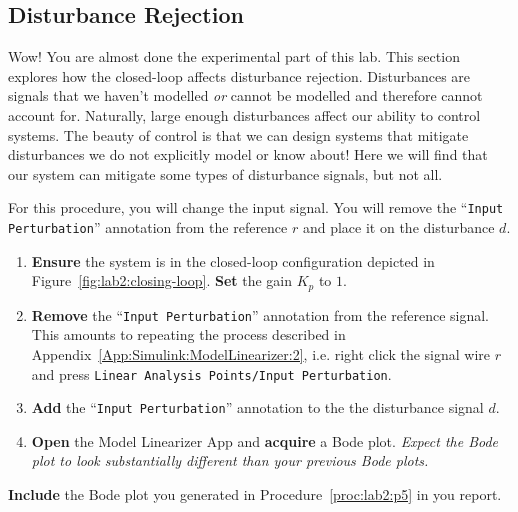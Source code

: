 \subsection{Disturbance Rejection}
Wow! You are almost done the experimental part of this lab. This section
explores how the closed-loop affects disturbance rejection. Disturbances are
signals that we haven't modelled \emph{or} cannot be modelled and therefore
cannot account for. Naturally, large enough disturbances affect our ability to
control systems. The beauty of control is that we can design systems that
mitigate disturbances we do not explicitly model or know about! Here we will
find that our system can mitigate some types of disturbance signals, but not
all.

\begin{procedure}[label={proc:lab2:p5}]
  For this procedure, you will change the input signal. You will remove the
  ``\texttt{Input Perturbation}'' annotation from the reference \(r\) and
  place it on the disturbance \(d.\)

  \begin{enumerate}[label=(\arabic*)]
    \item{
      \textbf{Ensure} the system is in the closed-loop configuration
      depicted in Figure~\ref{fig:lab2:closing-loop}. \textbf{Set} the gain
      \(K_p\) to \(1.\)
    }
    \item{
      \textbf{Remove} the ``\texttt{Input Perturbation}'' annotation from
      the reference signal. This amounts to repeating the process described
      in Appendix~\ref{App:Simulink:ModelLinearizer:2}, i.e. right click the
      signal wire \(r\) and press
      \texttt{Linear Analysis Points/Input Perturbation}.
    }
    \item{
      \textbf{Add} the ``\texttt{Input Perturbation}'' annotation to the
      the disturbance signal \(d.\)
    }
    \item{
      \textbf{Open} the Model Linearizer App and \textbf{acquire} a Bode
      plot. \emph{Expect the Bode plot to look substantially different than
      your previous Bode plots.}
    }
  \end{enumerate}
\end{procedure}
%
\begin{deliverable}[label={lab2:d4}]
  \textbf{Include} the Bode plot you generated in Procedure~\ref{proc:lab2:p5}
  in you report.
\end{deliverable}

